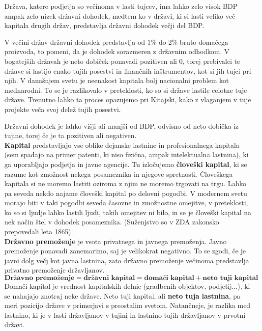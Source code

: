 \documentclass[a4paper,12 pt]{article}
\begin{document}
Država, katere podjetja so večinoma v lasti tujcev, ima lahko zelo visok BDP ampak zelo nizek državni dohodek, medtem ko v državi, ki si lasti veliko več kapitala drugih držav, predstavlja državni dohodek večji del BDP.


V večini držav državni dohodek predstavlja od $1\%$ do $2\%$ bruto domačega proizvoda, to pomeni, da je dohodek sorazmeren z državnim odhodkom. V bogatejših državah je neto dobiček ponavadi pozitiven ali 0, torej prebivalci te države si lastijo enako tujih posestvi in finančnih inštrumentov, kot si jih tujci pri njih. V današnjem svetu je neenakost kapitala bolj nacionalni problem kot mednarodni. To se je razlikovalo v preteklosti, ko so si države lastile celotne tuje države. Trenutno lahko ta proces opazujemo pri Kitajski, kako z vlaganjem v tuje projekte veča svoj delež tujih posestvi.

Državni dohodek je lahko višji ali manjši od BDP, odvisno od neto dobička iz tujine, torej če je ta pozitiven ali negativen.
\\

\textbf{Kapital} predstavljajo vse oblike dejanske lastnine in profesionalnega kapitala (sem spadajo na primer patenti, ki niso fizična, ampak intelektualna lastnina), ki ga uporabljajo podjetja in javne agencije. Tu izločujemo \textbf{človeški kapital}, ki se razume kot zmožnost nekega posameznika in njegove spretnosti. Človeškega kapitala si ne moremo lastiti oziroma z njim ne moremo trgovati na trgu. Lahko pa seveda nekdo najame človeški kapital po delovni pogodbi. V modernem svetu morajo biti v taki pogodbi seveda časovne in zmožnostne omejitve, v preteklosti, ko so si ljudje lahko lastili ljudi, takih omejitev ni bilo, in se je človeški kapital na nek način štel v dohodek posameznika. (Suženjstvo so v ZDA zakonsko prepovedali leta 1865)
\\

\textbf{Državno premoženje} je vsota privatnega in javnega premoženja. Javno premoženje ponavadi zanemarimo, saj je velikokrat negativno. To se zgodi, če je javni dolg večj kot javna lastnina, zato državno premoženje večinoma predstavlja privatno premoženje državljanov.
$$
\textbf{Državno premoženje}=\textbf{državni kapital}=\textbf{domači kapital}+\textbf{neto tuji kapital}
$$
Domači kapital je vrednost kapitalskih delnic (gradbenih objektov, podjetij...), ki se nahajajo znotraj neke države. Neto tuji kapital, ali \textbf{neto tuja lastnina}, pa meri pozicijo države v primerjavi s preostalim svetom. Natančneje, je razlika med lastnino, ki je v lasti državljanov v tujini in lastnino tujih državljanov v prvotni državi.
\end{document}
